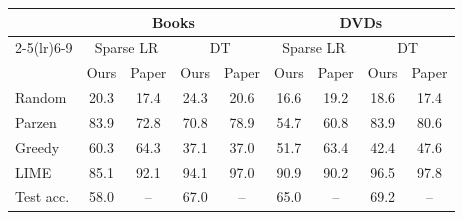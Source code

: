 \begin{tabular}{lcccccccc}
\toprule
 & \multicolumn{4}{c}{Books} & \multicolumn{4}{c}{DVDs} \\
\cmidrule(lr){2-5}\cmidrule(lr){6-9}
 & \multicolumn{2}{c}{Sparse LR} & \multicolumn{2}{c}{DT} & \multicolumn{2}{c}{Sparse LR} & \multicolumn{2}{c}{DT} \\
 & Ours & Paper & Ours & Paper & Ours & Paper & Ours & Paper \\
\midrule
Random & 20.3 & 17.4 & 24.3 & 20.6 & 16.6 & 19.2 & 18.6 & 17.4 \\
Parzen & 83.9 & 72.8 & 70.8 & 78.9 & 54.7 & 60.8 & 83.9 & 80.6 \\
Greedy & 60.3 & 64.3 & 37.1 & 37.0 & 51.7 & 63.4 & 42.4 & 47.6 \\
LIME & 85.1 & 92.1 & 94.1 & 97.0 & 90.9 & 90.2 & 96.5 & 97.8 \\
\midrule
Test acc. & 58.0 & -- & 67.0 & -- & 65.0 & -- & 69.2 & -- \\
\bottomrule
\end{tabular}
